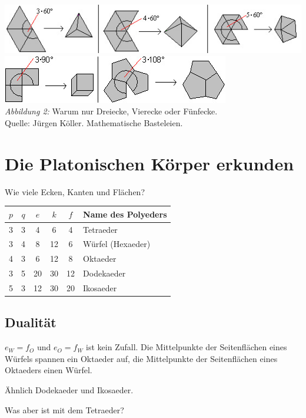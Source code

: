 \documentclass[11pt]{article}
\begin{document}
\begin{center}
  \includegraphics[width=.8\textwidth]{graebe-05-1/winkel-1.jpg}\\
  \includegraphics[width=.6\textwidth]{graebe-05-1/winkel-2.jpg}\\
  \emph{Abbildung 2:} Warum nur Dreiecke, Vierecke oder Fünfecke.\\ Quelle:
  Jürgen Köller. Mathematische Basteleien. \cite{KoellerPlatonisch}
\end{center}

\section*{Die Platonischen Körper erkunden}

Wie viele Ecken, Kanten und Flächen?
\begin{center}
  \begin{tabular}{|cc|ccc|l|}\hline
    $p$ & $q$ & $e$ & $k$ & $f$ & Name des Polyeders \\\hline
    3 & 3 &  4 &  6 &  4 & Tetraeder\\
    3 & 4 &  8 & 12 &  6 & Würfel (Hexaeder)\\
    4 & 3 &  6 & 12 &  8 & Oktaeder\\
    3 & 5 & 20 & 30 & 12 & Dodekaeder\\
    5 & 3 & 12 & 30 & 20 & Ikosaeder\\\hline
  \end{tabular}
\end{center}

\subsection*{Dualität}

$e_W=f_O$ und $e_O=f_W$ ist kein Zufall. Die Mittelpunkte der Seitenflächen
eines Würfels spannen ein Oktaeder auf, die Mittelpunkte der Seitenflächen
eines Oktaeders einen Würfel.

Ähnlich Dodekaeder und Ikosaeder.

Was aber ist mit dem Tetraeder? 
\end{document}
